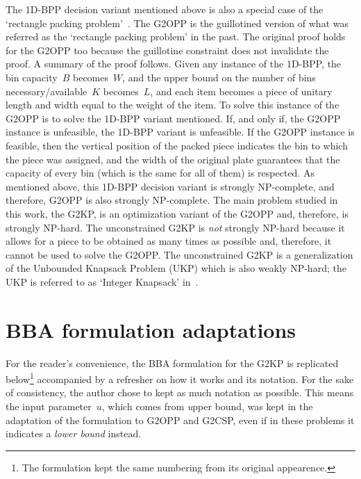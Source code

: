 The 1D-BPP decision variant mentioned above is also a special case of the `rectangle packing problem'~\citep{korf:initial:2003}.
The G2OPP is the guillotined version of what was referred as the `rectangle packing problem' in the past.
The original proof holds for the G2OPP too because the guillotine constraint does not invalidate the proof.
A summary of the proof follows.
Given any instance of the 1D-BPP, the bin capacity~\(B\) becomes~\(W\), and the upper bound on the number of bins necessary/available~\(K\) becomes~\(L\), and each item becomes a piece of unitary length and width equal to the weight of the item.
To solve this instance of the G2OPP is to solve the 1D-BPP variant mentioned.
If, and only if, the G2OPP instance is unfeasible, the 1D-BPP variant is unfeasible.
If the G2OPP instance is feasible, then the vertical position of the packed piece indicates the bin to which the piece was assigned, and the width of the original plate guarantees that the capacity of every bin (which is the same for all of them) is respected.
As mentioned above, this 1D-BPP decision variant is strongly NP-complete, and therefore, G2OPP is also strongly NP-complete.
The main problem studied in this work, the G2KP, is an optimization variant of the G2OPP and, therefore, is strongly NP-hard.
The unconstrained G2KP is \emph{not} strongly NP-hard because it allows for a piece to be obtained as many times as possible and, therefore, it cannot be used to solve the G2OPP.
The unconstrained G2KP is a generalization of the Unbounded Knapsack Problem (UKP) which is also weakly NP-hard; the UKP is referred to as `Integer Knapsack' in~\citet[MP10]{garey:1979}.

\section{BBA formulation adaptations}
\label{sec:formulation_adaptation}

For the reader's convenience, the BBA formulation for the G2KP is replicated below\footnote{The formulation kept the same numbering from its original appearence.} accompanied by a refresher on how it works and its notation.
For the sake of consistency, the author chose to kept as much notation as possible. This means the input parameter~\(u\), which comes from \emph{u}pper bound, was kept in the adaptation of the formulation to G2OPP and G2CSP, even if in these problems it indicates a \emph{lower bound} instead.

